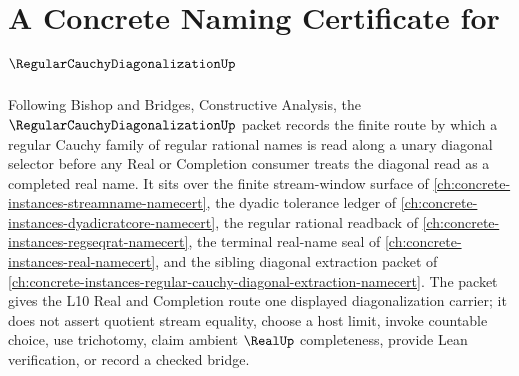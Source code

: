 \chapter{A Concrete Naming Certificate for $\RegularCauchyDiagonalizationUp$}
\label{ch:concrete-instances-regular-cauchy-diagonalization-namecert}

Following Bishop and Bridges, Constructive Analysis, the $\RegularCauchyDiagonalizationUp$ packet records the finite route by which a regular Cauchy family of regular rational names is read along a unary diagonal selector before any Real or Completion consumer treats the diagonal read as a completed real name. It sits over the finite stream-window surface of \autoref{ch:concrete-instances-streamname-namecert}, the dyadic tolerance ledger of \autoref{ch:concrete-instances-dyadicratcore-namecert}, the regular rational readback of \autoref{ch:concrete-instances-regseqrat-namecert}, the terminal real-name seal of \autoref{ch:concrete-instances-real-namecert}, and the sibling diagonal extraction packet of \autoref{ch:concrete-instances-regular-cauchy-diagonal-extraction-namecert}. The packet gives the L10 Real and Completion route one displayed diagonalization carrier; it does not assert quotient stream equality, choose a host limit, invoke countable choice, use trichotomy, claim ambient $\RealUp$ completeness, provide Lean verification, or record a checked bridge.

